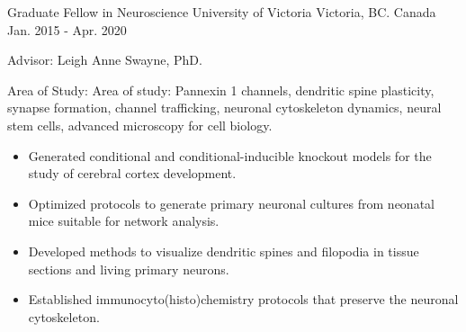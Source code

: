 

\begin{cventries}

  \cventry
    {Graduate Fellow in Neuroscience} %
    {University of Victoria} %
    {Victoria, BC. Canada} %
    {Jan. 2015 - Apr. 2020} %
    {
      \begin{cvitems} %
        \item {Advisor: Leigh Anne Swayne, PhD.}
        \item {Area of Study: Area of study: Pannexin 1 channels, dendritic spine plasticity, synapse formation, channel trafficking, neuronal cytoskeleton dynamics, neural stem cells, advanced microscopy for cell biology.}
        \begin{itemize}
          \begin{itemize}
            \item {Generated conditional and conditional-inducible knockout models for the study of cerebral cortex development.}
            \item {Optimized protocols to generate primary neuronal cultures from neonatal mice suitable for network analysis.}
            \item {Developed methods to visualize dendritic spines and filopodia in tissue sections and living primary neurons.}
            \item {Established immunocyto(histo)chemistry protocols that preserve the neuronal cytoskeleton.}
            \end{itemize}
        \end{itemize}
      \end{cvitems}
    }


\end{cventries}
